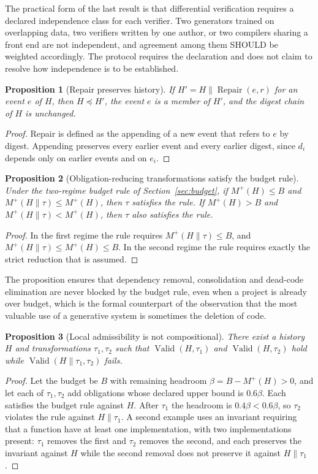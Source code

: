 \documentclass[11pt]{article}
\newtheorem{proposition}{Proposition}
\theoremstyle{remark}
\newcommand{\Adm}{\operatorname{Valid}}
\newcommand{\concat}{\mathbin{\|}}
\begin{document}
The practical form of the last result is that differential verification requires a declared independence class for each verifier. Two generators trained on overlapping data, two verifiers written by one author, or two compilers sharing a front end are not independent, and agreement among them SHOULD be weighted accordingly. The protocol requires the declaration and does not claim to resolve how independence is to be established.

\begin{proposition}[Repair preserves history]
If $H'=H\concat\operatorname{Repair}(e,r)$ for an event $e$ of $H$, then $H\preceq H'$, the event $e$ is a member of $H'$, and the digest chain of $H$ is unchanged.
\end{proposition}
\begin{proof}
Repair is defined as the appending of a new event that refers to $e$ by digest. Appending preserves every earlier event and every earlier digest, since $d_i$ depends only on earlier events and on $e_i$.
\end{proof}

\begin{proposition}[Obligation-reducing transformations satisfy the budget rule]\label{prop:budget}
Under the two-regime budget rule of Section~\ref{sec:budget}, if $M^{+}(H)\le B$ and $M^{+}(H\concat\tau)\le M^{+}(H)$, then $\tau$ satisfies the rule. If $M^{+}(H)>B$ and $M^{+}(H\concat\tau)<M^{+}(H)$, then $\tau$ also satisfies the rule.
\end{proposition}
\begin{proof}
In the first regime the rule requires $M^{+}(H\concat\tau)\le B$, and $M^{+}(H\concat\tau)\le M^{+}(H)\le B$. In the second regime the rule requires exactly the strict reduction that is assumed.
\end{proof}

The proposition ensures that dependency removal, consolidation and dead-code elimination are never blocked by the budget rule, even when a project is already over budget, which is the formal counterpart of the observation that the most valuable use of a generative system is sometimes the deletion of code.

\begin{proposition}[Local admissibility is not compositional]\label{prop:noncomp}
There exist a history $H$ and transformations $\tau_1,\tau_2$ such that $\Adm(H,\tau_1)$ and $\Adm(H,\tau_2)$ hold while $\Adm(H\concat\tau_1,\tau_2)$ fails.
\end{proposition}
\begin{proof}
Let the budget be $B$ with remaining headroom $\beta=B-M^{+}(H)>0$, and let each of $\tau_1,\tau_2$ add obligations whose declared upper bound is $0.6\beta$. Each satisfies the budget rule against $H$. After $\tau_1$ the headroom is $0.4\beta<0.6\beta$, so $\tau_2$ violates the rule against $H\concat\tau_1$. A second example uses an invariant requiring that a function have at least one implementation, with two implementations present: $\tau_1$ removes the first and $\tau_2$ removes the second, and each preserves the invariant against $H$ while the second removal does not preserve it against $H\concat\tau_1$.
\end{proof}
\end{document}
